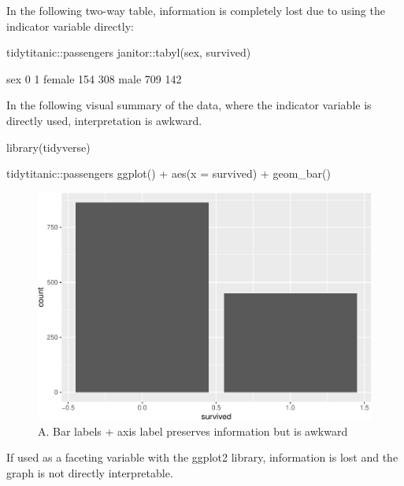 In the following two-way table, information is completely lost due to
using the indicator variable directly:

\begin{Schunk}
\begin{Sinput}
tidytitanic::passengers %
  janitor::tabyl(sex, survived)
\end{Sinput}
\begin{Soutput}
         sex   0   1
      female 154 308
        male 709 142
\end{Soutput}
\end{Schunk}

In the following visual summary of the data, where the indicator
variable is directly used, interpretation is awkward.

\begin{Schunk}
\begin{Sinput}
library(tidyverse)

tidytitanic::passengers %
  ggplot() + 
  aes(x = survived) + 
  geom_bar()
\end{Sinput}
\begin{figure}
\includegraphics[width=0.69\linewidth]{r_journal_files/figure-latex/direct_visual_awkward-1} \caption[A]{A. Bar labels + axis label preserves information but is awkward}\label{fig:direct_visual_awkward}
\end{figure}
\end{Schunk}

If used as a faceting variable with the ggplot2 library, information is
lost and the graph is not directly interpretable.

